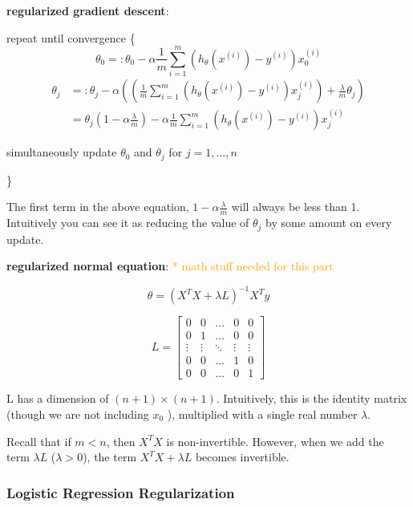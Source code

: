 \documentclass{article}
\begin{document}
\noindent \textbf{regularized gradient descent}:

\noindent repeat until convergence \{
\[\theta_0 =: \theta_0 - \alpha \frac{1}{m} \sum_{i = 1}^m (h_{\theta}(x^{(i)}) - y^{(i)}) x^{(i)}_0\]
\begin{equation*}
\begin{split}
\theta_j & =: \theta_j - \alpha ((\frac{1}{m} \sum_{i = 1}^m (h_{\theta}(x^{(i)}) - y^{(i)}) x^{(i)}_j) + \frac{\lambda}{m} \theta_j) \\
 & = \theta_j (1 - \alpha \frac{\lambda}{m}) - \alpha \frac{1}{m} \sum_{i = 1}^m (h_{\theta}(x^{(i)}) - y^{(i)}) x^{(i)}_j
\end{split}
\end{equation*}

\centerline{simultaneously update \(\theta_0\) and \(\theta_j\) for \(j = 1, \dots, n\)}
\}

\bigskip

\noindent The first term in the above equation, \(1 - \alpha \frac{\lambda}{m}\) will always be less than 1. Intuitively you can see it as reducing the value of \(\theta_j\) by some amount on every update.

\bigskip

\noindent \textbf{regularized normal equation}: \textcolor{orange}{ * math stuff needed for this part}

\[
\theta = (X^TX + \lambda L)^{-1}X^Ty
\]

\[
L = 
\begin{bmatrix}
0 & 0 & \dots & 0 & 0\\
0 & 1 & \dots & 0 & 0\\
\vdots & \vdots & \ddots & \vdots & \vdots\\
0 & 0 & \dots & 1 & 0\\
0 & 0 & \dots & 0 & 1
\end{bmatrix}
\]

\bigskip

\noindent L has a dimension of \((n + 1) \times (n + 1)\). Intuitively, this is the identity matrix (though we are not including \(x_0\) ), multiplied with a single real number \(\lambda\).

\bigskip

\noindent Recall that if \(m < n\), then \(X^TX\) is non-invertible. However, when we add the term \(\lambda L\) (\(\lambda > 0\)), the term \(X^TX + \lambda L\) becomes invertible.

\subsubsection{Logistic Regression Regularization}
\end{document}
